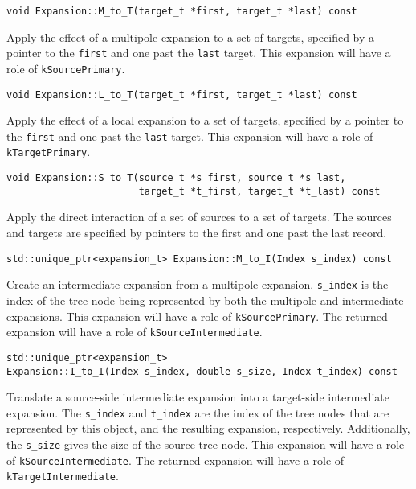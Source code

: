 \begin{lstlisting}
void Expansion::M_to_T(target_t *first, target_t *last) const
\end{lstlisting}

\noindent Apply the effect of a multipole expansion to a set of targets,
specified by a pointer to the \texttt{first} and one past the \texttt{last}
target.
This expansion will have a role of \texttt{kSourcePrimary}.

\begin{lstlisting}
void Expansion::L_to_T(target_t *first, target_t *last) const
\end{lstlisting}

\noindent Apply the effect of a local expansion to a set of targets, specified
by a pointer to the \texttt{first} and one past the \texttt{last} target.
This expansion will have a role of \texttt{kTargetPrimary}.

\begin{lstlisting}
void Expansion::S_to_T(source_t *s_first, source_t *s_last,
                       target_t *t_first, target_t *t_last) const
\end{lstlisting}

\noindent Apply the direct interaction of a set of sources to a set of targets.
The sources and targets are specified by pointers to the first and one past the
last record.

\begin{lstlisting}
std::unique_ptr<expansion_t> Expansion::M_to_I(Index s_index) const
\end{lstlisting}

\noindent Create an intermediate expansion from a multipole expansion.
\texttt{s\_index} is the index of the tree node being represented by both the
multipole and intermediate expansions.
This expansion will have a role of \texttt{kSourcePrimary}.
The returned expansion will have a role of \texttt{kSourceIntermediate}.

\begin{lstlisting}
std::unique_ptr<expansion_t>
Expansion::I_to_I(Index s_index, double s_size, Index t_index) const
\end{lstlisting}

\noindent Translate a source-side intermediate expansion into a target-side
intermediate expansion. The \texttt{s\_index} and \texttt{t\_index} are the
index of the tree nodes that are represented by this object, and the
resulting expansion, respectively. Additionally, the \texttt{s\_size} gives
the size of the source tree node.
This expansion will have a role of \texttt{kSourceIntermediate}.
The returned expansion will have a role of \texttt{kTargetIntermediate}.

